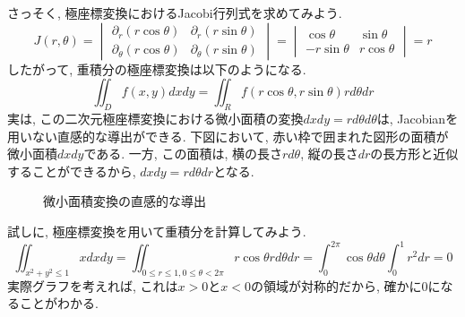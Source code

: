         さっそく, 極座標変換におけるJacobi行列式を求めてみよう.
        \begin{equation*}
            J(r,\theta)=\begin{vmatrix}\partial_r(r\cos\theta) & \partial_r (r\sin\theta) \\ \partial_\theta (r\cos\theta) & \partial_\theta (r\sin\theta) \end{vmatrix}
            =\begin{vmatrix}\cos\theta & \sin\theta \\ -r\sin\theta & r\cos\theta\end{vmatrix}=r
        \end{equation*}
        したがって, 重積分の極座標変換は以下のようになる.
        \begin{equation}
            \iint_D f(x,y)dxdy = \iint_R f(r\cos\theta,r\sin\theta)rd\theta dr\label{eq:多重積分:重積分の極座標変換}
        \end{equation}
        実は, この二次元極座標変換における微小面積の変換$dxdy=rd\theta d\theta$は, Jacobianを用いない直感的な導出ができる.
        下図において, 赤い枠で囲まれた図形の面積が微小面積$dxdy$である. 一方, この面積は, 横の長さ$rd\theta$, 縦の長さ$dr$の長方形と近似することができるから, 
        $dxdy=rd\theta dr$となる.
        \begin{figure}[h]
            \centering
            \caption{微小面積変換の直感的な導出}
        \end{figure}
        \clearpage
        試しに, 極座標変換を用いて重積分を計算してみよう.
        \begin{equation*}
            \iint_{x^2+y^2\leq 1}xdxdy=\iint_{0\leq r\leq 1,0\leq\theta<2\pi}r\cos\theta rd\theta dr = \int_{0}^{2\pi}\cos\theta d\theta\int_{0}^{1}r^2dr=0
        \end{equation*}
        実際グラフを考えれば, これは$x>0$と$x<0$の領域が対称的だから, 確かに0になることがわかる.\\

